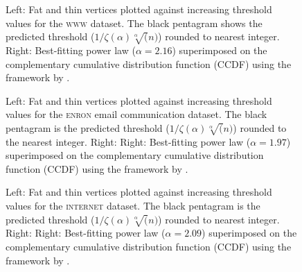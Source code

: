 \documentclass{article}
\theoremstyle{remark}
\begin{document}
\begin{figure}[!ht]
\centering
{}\caption{Left: Fat and thin vertices plotted against increasing threshold values for the \textsc{www} dataset. The black pentagram shows the predicted threshold ($1/\zeta(\alpha)\sqrt[\alpha](n)$) rounded to nearest integer. Right: Best-fitting power law ($\alpha = 2.16$) superimposed on the complementary cumulative distribution function (CCDF) using the framework by \cite{clauset2009power}.} \label{fig:www}\end{figure}

\begin{figure}[!ht]
\centering
{}\caption{Left: Fat and thin vertices plotted against increasing threshold values for the \textsc{enron} email communication dataset. The black pentagram is the predicted threshold ($1/\zeta(\alpha)\sqrt[\alpha](n)$) rounded to the nearest integer. Right: Right: Best-fitting power law ($\alpha = 1.97$)  superimposed on the complementary cumulative distribution function (CCDF) using the framework by \cite{clauset2009power}.}
\label{fig:enron}\end{figure}

\begin{figure}[!ht]
\centering
{}\caption{Left: Fat and thin vertices plotted against increasing threshold values for the \textsc{internet} dataset. The black pentagram is the predicted threshold ($1/\zeta(\alpha)\sqrt[\alpha](n)$) rounded to nearest integer. Right: Right: Best-fitting power law ($\alpha = 2.09$) superimposed on the complementary cumulative distribution function (CCDF) using the framework by \cite{clauset2009power}.} \label{fig:internet}\end{figure}
\end{document}
